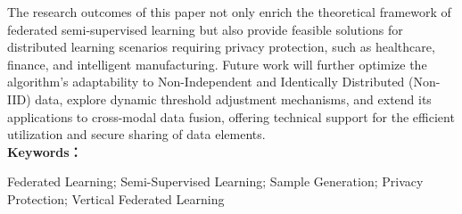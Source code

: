 The research outcomes of this paper not only enrich the theoretical framework of federated semi-supervised learning but also provide feasible solutions for distributed learning scenarios requiring privacy protection, such as healthcare, finance, and intelligent manufacturing. Future work will further optimize the algorithm’s adaptability to Non-Independent and Identically Distributed (Non-IID) data, explore dynamic threshold adjustment mechanisms, and extend its applications to cross-modal data fusion, offering technical support for the efficient utilization and secure sharing of data elements.
\\


\noindent\textbf{Keywords：} 
\begin{minipage}[t]{0.85\linewidth}
	Federated Learning; Semi-Supervised Learning; Sample Generation; Privacy Protection; Vertical Federated Learning
\end{minipage}

\clearpage